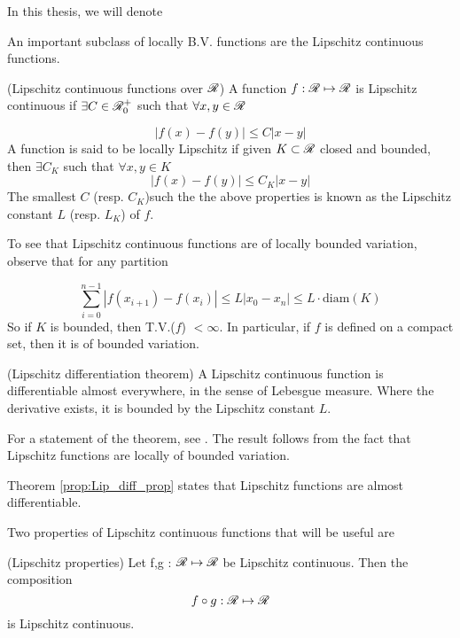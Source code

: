 \begin{definition}
In this thesis, we will denote 

An important subclass of locally B.V. functions are the Lipschitz continuous functions. 

\begin{definition}(Lipschitz continuous functions over $\mathscr{R}$)
	A function $f : \mathscr{R} \mapsto \mathscr{R}$ is Lipschitz continuous if $ \exists C \in \mathscr{R}^+_0$ such that $\forall x,y \in \mathscr{R}$
	
	\begin{equation} \label{def:Lipschitz_R}
		\left|f(x) - f(y)\right| \leq C\left|x - y\right|
	\end{equation} 
	A function is said to be locally Lipschitz if given $K \subset \mathscr{R}$ closed and bounded, then $\exists C_K$ such that $\forall x,y \in K$
	\begin{equation} \label{def:Lipschitz_K}
		\left|f(x) - f(y)\right| \leq C_K\left|x - y\right|
	\end{equation} 
	The smallest $C$ (resp. $C_K$)such the the above properties is known as the Lipschitz constant $L$ (resp. $L_K$) of $f$. 
\end{definition} 

To see that Lipschitz continuous functions are of locally bounded variation, observe that for any partition 

\begin{equation}
	\sum_{i = 0}^{n-1} \left| f(x_{i+1}) - f(x_i)\right| \leq L\left| x_0 - x_n \right| \leq L \cdot \text{diam}(K)
\end{equation}
So if $K$ is bounded, then T.V.($f$) $< \infty$. In particular, if $f$ is defined on a compact set, then it is of bounded variation. 

\begin{theorem}(Lipschitz differentiation theorem) \label{prop:Lip_diff_prop}
	A Lipschitz continuous function is differentiable almost everywhere, in the sense of Lebesgue measure. Where the derivative exists, it is bounded by the Lipschitz constant $L$. 
\end{theorem}
\begin{remark}
	For a statement of the theorem, see \cite[p.167]{tao2011introduction}. The result follows from the fact that Lipschitz functions are locally of bounded variation. 
\end{remark}

Theorem \eqref{prop:Lip_diff_prop} states that Lipschitz functions are almost differentiable. 

Two properties of Lipschitz continuous functions that will be useful are 
\begin{proposition}(Lipschitz properties) \label{prop: Lipschitz_props}
	Let f,g : $\mathscr{R} \mapsto \mathscr{R}$ be Lipschitz continuous. Then the composition
	\begin{equation}
		f \circ g : \mathscr{R} \mapsto \mathscr{R}
	\end{equation}
	is Lipschitz continuous. 
	

\end{proposition}
\end{definition}

